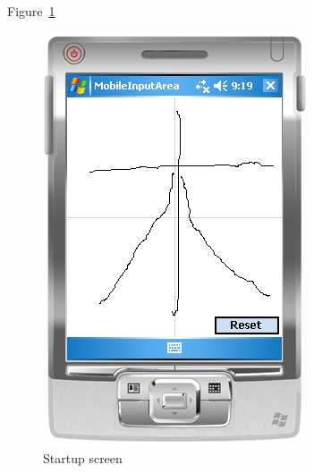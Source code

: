 Figure~\ref{fig:mobileDeviceInput}
\begin{figure}[htbp]
\begin{center}
\includegraphics[scale=0.7]{images/ConceptualDesign/mobileDeviceInput.png}
\caption{Startup screen}
\label{fig:mobileDeviceInput}
\end{center}
\end{figure}





